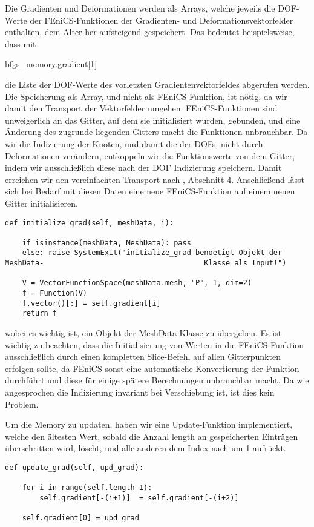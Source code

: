 Die Gradienten und Deformationen werden als Arrays, welche jeweils die DOF-Werte der FEniCS-Funktionen der Gradienten- und Deformationsvektorfelder enthalten, dem Alter her aufsteigend gespeichert. Das bedeutet beispielsweise, dass mit 
\begin{center}
	\textsf{bfgs\_memory.gradient[1]}
\end{center} 
die Liste der DOF-Werte des vorletzten Gradientenvektorfeldes abgerufen werden. Die Speicherung als Array, und nicht als FEniCS-Funktion, ist nötig, da wir damit den Transport der Vektorfelder umgehen. FEniCS-Funktionen sind unweigerlich an das Gitter, auf dem sie initialisiert wurden, gebunden, und eine Änderung des zugrunde liegenden Gitters macht die Funktionen unbrauchbar. Da wir die Indizierung der Knoten, und damit die der DOFs, nicht durch Deformationen verändern, entkoppeln wir die Funktionswerte von dem Gitter, indem wir ausschließlich diese nach der DOF Indizierung speichern. Damit erreichen wir den vereinfachten Transport nach \cite{diffusion}, Abschnitt 4. 
Anschließend  lässt sich bei Bedarf mit diesen Daten eine neue FEniCS-Funktion auf einem neuen Gitter initialisieren.
\begin{lstlisting}
def initialize_grad(self, meshData, i):

    if isinstance(meshData, MeshData): pass
    else: raise SystemExit("initialize_grad benoetigt Objekt der MeshData-			 						   Klasse als Input!")

    V = VectorFunctionSpace(meshData.mesh, "P", 1, dim=2)
    f = Function(V)
    f.vector()[:] = self.gradient[i]
    return f
\end{lstlisting}
wobei es wichtig ist, ein Objekt der \textsf{MeshData}-Klasse zu übergeben. Es ist wichtig zu beachten, dass die Initialisierung von Werten in die FEniCS-Funktion ausschließlich durch einen kompletten Slice-Befehl auf allen Gitterpunkten erfolgen sollte, da FEniCS sonst eine automatische Konvertierung der Funktion durchführt und diese für einige spätere Berechnungen unbrauchbar macht. Da wie angesprochen die Indizierung invariant bei Verschiebung ist, ist dies kein Problem.

Um die Memory zu updaten, haben wir eine Update-Funktion implementiert, welche 
den ältesten Wert, sobald die Anzahl \textsf{length} an gespeicherten Einträgen überschritten wird, löscht, und alle anderen dem Index nach um 1 aufrückt. 

\begin{lstlisting}
def update_grad(self, upd_grad):
    
    for i in range(self.length-1): 
      	self.gradient[-(i+1)]  = self.gradient[-(i+2)]
    
    self.gradient[0] = upd_grad
\end{lstlisting}

